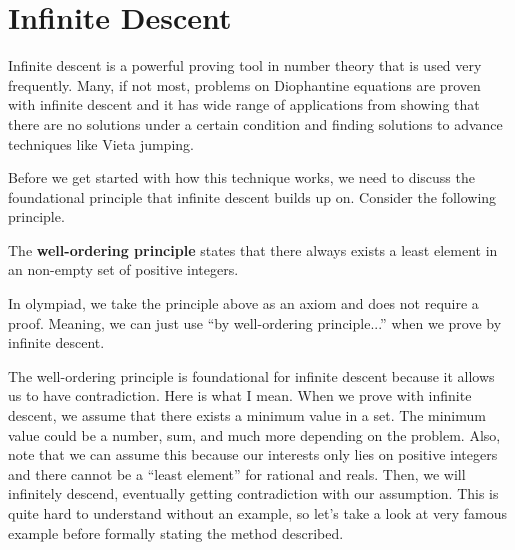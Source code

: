 \documentclass[../../../main.tex]{subfiles}
\begin{document}
\section{Infinite Descent}

Infinite descent is a powerful proving tool in number theory that
is used very frequently. Many, if not most, problems on Diophantine
equations are proven with infinite descent and it has wide range
of applications from showing that there are no solutions under
a certain condition and finding solutions to advance techniques
like Vieta jumping.

Before we get started with how this technique works, we need to
discuss the foundational principle that infinite descent builds
up on. Consider the following principle.

\begin{theorem}{}{}
The \textbf{well-ordering principle} states that there always
exists a least element in an non-empty set of positive integers.
\end{theorem}

In olympiad, we take the principle above as an axiom and does not
require a proof. Meaning, we can just use ``by well-ordering
principle...'' when we prove by infinite descent.

The well-ordering principle is foundational for infinite descent
because it allows us to have contradiction. Here is what I mean.
When we prove with infinite descent, we assume that there exists
a minimum value in a set. The minimum value could be a number,
sum, and much more depending on the problem. Also, note that we
can assume this because our interests only lies on positive
integers and there cannot be a ``least element'' for rational
and reals. Then, we will infinitely descend, eventually getting
contradiction with our assumption. This is quite hard to understand
without an example, so let's take a look at very famous example
before formally stating the method described.
\end{document}
